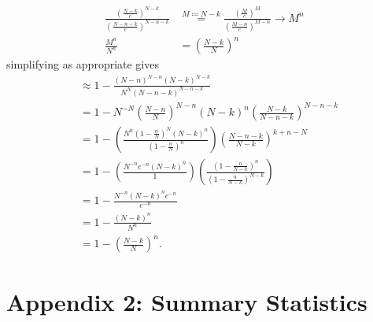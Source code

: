 \documentclass{article}
\theoremstyle{definition}
\begin{document}
\begin{align}
    \frac{\left(\frac{N-k}{e}\right)^{N-k}}{\left(\frac{N-n-k}{e}\right)^{N-n-k}}&\stackrel{M\coloneqq N-k}{=}\frac{\left(\frac{M}{e}\right)^{M}}{\left(\frac{M-n}{e}\right)^{M-n}}\to M^{n} \nonumber\\
    \frac{M^{n}}{N^{n}}&=\left(\frac{N-k}{N}\right)^{n}\nonumber
\end{align}
simplifying as appropriate gives
\begin{align}
    & \approx 1- \frac{\left(N-n\right)^{N-n}\left(N-k\right)^{N-k}}{N^{N}\left(N-n-k\right)^{N-n-k}} \nonumber\\
    &= 1- N^{-N}\left(\frac{N-n}{N}\right)^{N-n}\left(N-k\right)^{n}\left(\frac{N-k}{N-n-k}\right)^{N-n-k} \nonumber\\
    &=1-\left(\frac{N^{n}\left(1-\frac{n}{N}\right)^{N}\left(N-k\right)^{n}}{\left(1-\frac{n}{N}\right)^{n}}\right)\left(\frac{N-n-k}{N-k}\right)^{k+n-N} \nonumber\\
    &=1-\left(\frac{N^{-n}e^{-n}\left(N-k\right)^{n}}{1}\right)\left(\frac{\left(1-\frac{n}{N-k}\right)^{n}}{\left(1-\frac{n}{N-k}\right)^{N-k}}\right) \nonumber\\
    &=1-\frac{N^{-n}\left(N-k\right)^{n}e^{-n}}{e^{-n}} \nonumber\\
    &=1-\frac{\left(N-k\right)^{n}}{N^{n}} \nonumber\\
    &=1-\left(\frac{N-k}{N}\right)^{n}.\nonumber
\end{align}

\newpage
\section{Appendix 2: Summary Statistics}
\label {Appendix 2}
\end{document}
